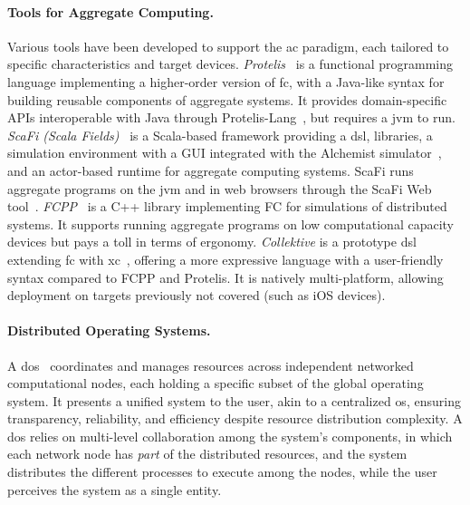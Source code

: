 \documentclass[12pt, a4paper]{article}
\begin{document}
\sloppypar
\paragraph{Tools for Aggregate Computing.}
Various tools have been developed to support the \ac{ac} paradigm,
each tailored to specific characteristics and target devices.
%
\emph{Protelis}~\cite{PianiniSAC2015} is a functional programming language implementing a higher-order version of \ac{fc},
with a Java-like syntax for building reusable components of aggregate systems.
%
It provides domain-specific APIs interoperable with Java through Protelis-Lang~\cite{SASO2017-protelislang}, but requires a \ac{jvm} to run.
%
\emph{ScaFi (Scala Fields)}~\cite{scafi} is a Scala-based framework providing a \ac{dsl}, libraries,
a simulation environment with a GUI integrated with the Alchemist simulator~\cite{PianiniJOS2013},
and an actor-based runtime for aggregate computing systems.
%
ScaFi runs aggregate programs on the \ac{jvm} and in web browsers through the ScaFi Web tool~\cite{Coordination2021-scafiweb}.
%
\emph{FCPP}~\cite{DBLP:journals/scp/AudritoT24} is a C++ library implementing FC for simulations of distributed systems.
%
It supports running aggregate programs on low computational capacity devices but pays a toll in terms of ergonomy.
%
\emph{Collektive} is a prototype \ac{dsl} extending \ac{fc} with \ac{xc}~\cite{AudritoCDSV24},
offering a more expressive language with a user-friendly syntax compared to FCPP and Protelis.
%
It is natively multi-platform, allowing deployment on targets previously not covered (such as iOS devices).

\sloppypar
\paragraph{Distributed Operating Systems.}
A \ac{dos}~\cite{DBLP:journals/csur/TanenbaumR85} coordinates and manages resources across independent networked computational nodes,
each holding a specific subset of the global operating system.
%
It presents a unified system to the user,
akin to a centralized \ac{os}, ensuring transparency, reliability, and efficiency despite resource distribution complexity.
%
%
A \ac{dos} relies on multi-level collaboration among the system's components,
in which each network node has \emph{part} of the distributed resources,
and the system distributes the different processes to execute among the nodes,
while the user perceives the system as a single entity.
\end{document}
